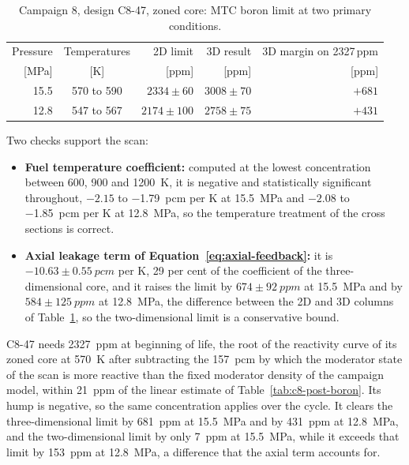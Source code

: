 \begin{table}[htbp]
  \centering
  \small
    \begin{threeparttable}
  \caption{Campaign 8, design C8-47, zoned core: MTC boron limit at two primary conditions.}
  \label{tab:c8-mtc}
  \begin{tabular}{@{}rcrrr@{}}
    \toprule
    Pressure & Temperatures & 2D limit & 3D result & 3D margin on 2327\,ppm \\
    {[MPa]} & [K] & [ppm] & [ppm] & [ppm] \\
    \midrule
    15.5 & 570 to 590 & $2334 \pm 60$  & $3008 \pm 70$ & $+681$ \\
    12.8 & 547 to 567 & $2174 \pm 100$ & $2758 \pm 75$ & $+431$ \\
    \bottomrule
  \end{tabular}
  \end{threeparttable}
\end{table}

Two checks support the scan:

\begin{itemize}
  \item \textbf{Fuel temperature coefficient:} computed at the lowest
        concentration between 600, 900 and \SI{1200}{K}, it is negative
        and statistically significant throughout, $-2.15$ to
        \SI{-1.79}{pcm} per K at \SI{15.5}{MPa} and $-2.08$ to
        \SI{-1.85}{pcm} per K at \SI{12.8}{MPa}, so the temperature
        treatment of the cross sections is correct.
  \item \textbf{Axial leakage term of
        Equation~\eqref{eq:axial-feedback}:} it is
        $-10.63 \pm \SI{0.55}{pcm}$ per K, 29 per cent of the
        coefficient of the three-dimensional core, and it raises the
        limit by $674 \pm \SI{92}{ppm}$ at \SI{15.5}{MPa} and by
        $584 \pm \SI{125}{ppm}$ at \SI{12.8}{MPa}, the difference
        between the 2D and 3D columns of Table~\ref{tab:c8-mtc}, so the
        two-dimensional limit is a conservative bound.
\end{itemize}

C8-47 needs \SI{2327}{ppm} at beginning of life, the root of the
reactivity curve of its zoned core at \SI{570}{K} after subtracting the
\SI{157}{pcm} by which the moderator state of the scan is more reactive
than the fixed moderator density of the campaign model, within
\SI{21}{ppm} of the linear estimate of Table~\ref{tab:c8-post-boron}.
Its hump is negative, so the same concentration applies over the cycle.
It clears the three-dimensional limit by \SI{681}{ppm} at \SI{15.5}{MPa}
and by \SI{431}{ppm} at \SI{12.8}{MPa}, and the two-dimensional limit by
only \SI{7}{ppm} at \SI{15.5}{MPa}, while it exceeds that limit by
\SI{153}{ppm} at \SI{12.8}{MPa}, a difference that the axial term
accounts for.

